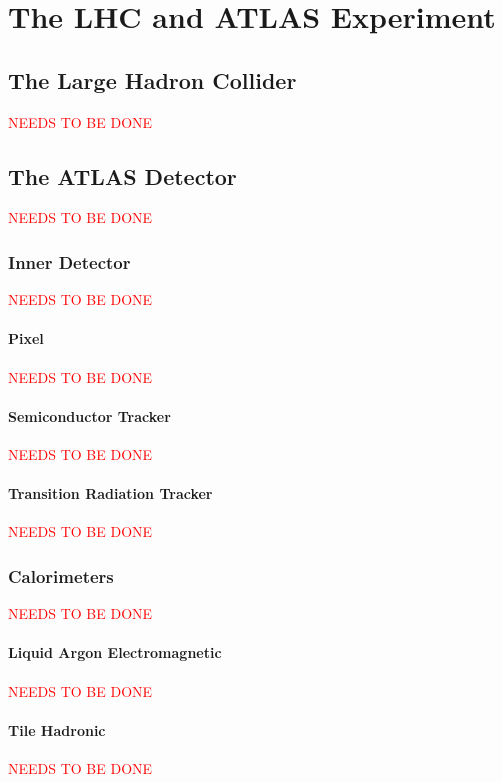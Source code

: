 \chapter{The LHC and ATLAS Experiment}

\section{The Large Hadron Collider}{
	\textcolor{red}{NEEDS TO BE DONE}
}

\section{The ATLAS Detector}{
	\textcolor{red}{NEEDS TO BE DONE}
}

	\subsection{Inner Detector}{
		\textcolor{red}{NEEDS TO BE DONE}
	}

		\subsubsection{Pixel}{
			\textcolor{red}{NEEDS TO BE DONE}
		}

		\subsubsection{Semiconductor Tracker}{
			\textcolor{red}{NEEDS TO BE DONE}
		}

		\subsubsection{Transition Radiation Tracker}{
			\textcolor{red}{NEEDS TO BE DONE}
		}

	\subsection{Calorimeters}{
		\textcolor{red}{NEEDS TO BE DONE}
	}

		\subsubsection{Liquid Argon Electromagnetic}{
			\textcolor{red}{NEEDS TO BE DONE}
		}

		\subsubsection{Tile Hadronic}{
			\textcolor{red}{NEEDS TO BE DONE}
		}

